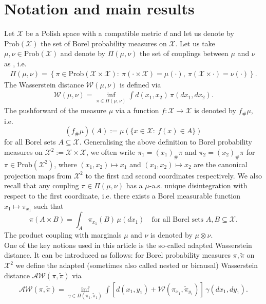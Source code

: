 \documentclass[10pt]{amsart}
\begin{document}
\section{Notation and main results}\label{sec:1}

Let $\mathcal{X}$ be a Polish space with a compatible metric $d$ and let us denote by $\mathrm{Prob}(\mathcal{X})$ the set of Borel probability measures on $\mathcal{X}$. Let us take $\mu,\nu\in \text{Prob}(\mathcal{X})$ and denote by $\Pi(\mu,\nu)$ the set of couplings between $\mu$ and $\nu$ as , i.e. 
\begin{align*}
\Pi(\mu,\nu)= \left\{\pi \in \mathrm{Prob}(\mathcal{X}\times \mathcal{X}) :\ \pi(\cdot\times \mathcal{X})=\mu(\cdot), \ \pi(\mathcal{X}\times \cdot)=\nu(\cdot)\right\}.
\end{align*}
The Wasserstein distance $\mathcal{W}(\mu,\nu)$ is defined via
\begin{align*}
\mathcal{W}(\mu,\nu)=\inf_{\pi \in \Pi(\mu,\nu)} \int d(x_1,x_2)\,\pi(dx_1,dx_2).
\end{align*}
The pushforward of the measure $\mu$ via a function $f:\mathcal{X}\to \mathcal{X}$ is denoted by $f_\#\mu$, i.e. $$(f_\#\mu)(A):=\mu(\{x\in \mathcal{X}:\ f(x)\in A\})$$ for all Borel sets $A\subseteq \mathcal{X}$. Generalising the above definition to Borel probability measures on $\mathcal{X}^2:=\mathcal{X}\times\mathcal{X}$, we often write $\pi_1=(x_1)_\#\pi$ and $\pi_2=(x_2)_\#\pi$  for $\pi\in \text{Prob}(\mathcal{X}^2)$, where $(x_1,x_2)\mapsto x_1$ and $(x_1,x_2)\mapsto x_2$ are the canonical projection maps from $\mathcal{X}^2$ to the first and second coordinates respectively. We also recall that any coupling $\pi\in \Pi(\mu,\nu)$ has a $\mu$-a.s. unique disintegration with respect to the first coordinate, i.e. there exists a Borel measurable function $x_1\mapsto \pi_{x_1}$ such that $$\pi(A\times B)=\int_A\pi_{x_1}(B)\,\mu(dx_1) \quad \text{for all Borel sets }A,B\subseteq \mathcal{X}.$$ The product coupling with marginals $\mu$ and $\nu$ is denoted by $\mu\otimes \nu$.\\
One of the key notions used in this article is the so-called adapted Wasserstein distance. It can be introduced as follows:
for Borel probability measures $\pi,\tilde{\pi}$ on $\mathcal{X}^2$ we define the adapted (sometimes also called nested or bicausal) Wasserstein distance $\mathcal{AW}(\pi,\tilde{\pi})$ via
\begin{align}\label{eq:causal}
\mathcal{AW}(\pi,\tilde{\pi})=\inf_{\gamma\in \Pi(\pi_1, \tilde{\pi}_1)} \int \left[d(x_1, y_1)+\mathcal{W}(\pi_{x_1}, \tilde{\pi}_{y_1})\right]\,\gamma(dx_1,dy_1).
\end{align} 
\end{document}
